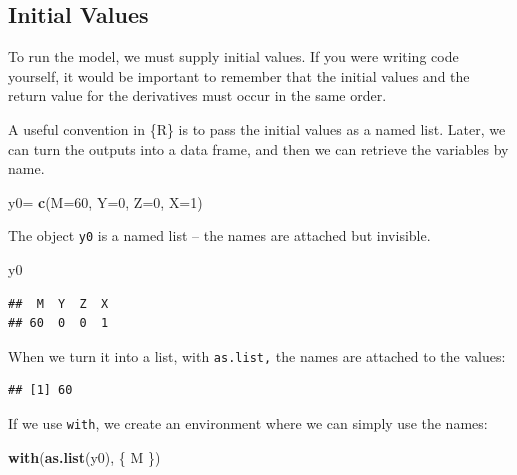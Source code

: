 \documentclass[
]{book}
\newenvironment{Shaded}{\begin{snugshade}}{\end{snugshade}}
\newcommand{\AttributeTok}[1]{\textcolor[rgb]{0.13,0.29,0.53}{#1}}
\newcommand{\DecValTok}[1]{\textcolor[rgb]{0.00,0.00,0.81}{#1}}
\newcommand{\FunctionTok}[1]{\textcolor[rgb]{0.13,0.29,0.53}{\textbf{#1}}}
\newcommand{\NormalTok}[1]{#1}
\newcommand{\OtherTok}[1]{\textcolor[rgb]{0.56,0.35,0.01}{#1}}
\newcommand{\SpecialCharTok}[1]{\textcolor[rgb]{0.81,0.36,0.00}{\textbf{#1}}}
\begin{document}
\subsection{Initial Values}\label{initial-values}

To run the model, we must supply initial values. If you were writing code yourself, it would be important to remember that the initial values and the return value for the derivatives must occur in the same order.

A useful convention in \{R\} is to pass the initial values as a named list. Later, we can turn the outputs into a data frame, and then we can retrieve the variables by name.

\begin{Shaded}
\begin{Highlighting}[]
\NormalTok{y0}\OtherTok{=} \FunctionTok{c}\NormalTok{(}\AttributeTok{M=}\DecValTok{60}\NormalTok{, }\AttributeTok{Y=}\DecValTok{0}\NormalTok{, }\AttributeTok{Z=}\DecValTok{0}\NormalTok{, }\AttributeTok{X=}\DecValTok{1}\NormalTok{)}
\end{Highlighting}
\end{Shaded}

The object \texttt{y0} is a named list -- the names are attached but invisible.

\begin{Shaded}
\begin{Highlighting}[]
\NormalTok{y0}
\end{Highlighting}
\end{Shaded}

\begin{verbatim}
##  M  Y  Z  X 
## 60  0  0  1
\end{verbatim}

When we turn it into a list, with \texttt{as.list,} the names are attached to the values:

\begin{Shaded}
\end{Shaded}

\begin{verbatim}
## [1] 60
\end{verbatim}

If we use \texttt{with}, we create an environment where we can simply use the names:

\begin{Shaded}
\begin{Highlighting}[]
\FunctionTok{with}\NormalTok{(}\FunctionTok{as.list}\NormalTok{(y0), \{}
\NormalTok{  M}
\NormalTok{\})}
\end{Highlighting}
\end{Shaded}
\end{document}
